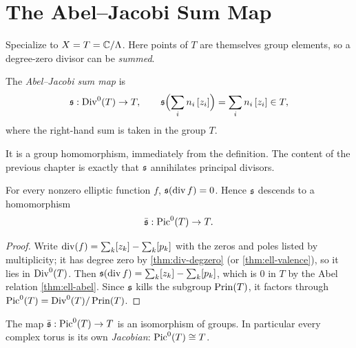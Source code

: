 \section{The Abel--Jacobi Sum Map}
\label{sec:div-abel-jacobi}

Specialize to \(X = T = \mathbb{C}/\Lambda\). Here points of \(T\) are themselves group
elements, so a degree-zero divisor can be \emph{summed}.

\begin{definition}
\label{def:div-sigma}
The \emph{Abel--Jacobi sum map} is
\[
  \mathfrak{s} : \operatorname{Div}^0(T) \to T,
  \qquad
  \mathfrak{s}\Bigl( \sum_i n_i\,[z_i] \Bigr) = \sum_i n_i\,[z_i] \in T,
\]
where the right-hand sum is taken in the group \(T\).
\end{definition}

It is a group homomorphism, immediately from the definition. The content of the
previous chapter is exactly that \(\mathfrak{s}\) annihilates principal divisors.

\begin{proposition}
\label{prop:div-sigma-kills-prin}
For every nonzero elliptic function \(f\), \(\mathfrak{s}(\operatorname{div} f) = 0\). Hence
\(\mathfrak{s}\) descends to a homomorphism
\[
  \bar{\mathfrak{s}} : \operatorname{Pic}^0(T) \to T .
\]
\end{proposition}

\begin{proof}
Write \(\operatorname{div}(f) = \sum_k [z_k] - \sum_k [p_k]\) with the zeros and poles
listed by multiplicity; it has degree zero by \cref{thm:div-degzero} (or
\cref{thm:ell-valence}), so it lies in \(\operatorname{Div}^0(T)\). Then
\(\mathfrak{s}(\operatorname{div} f) = \sum_k [z_k] - \sum_k [p_k]\), which is \(0\) in \(T\) by
the Abel relation \cref{thm:ell-abel}. Since \(\mathfrak{s}\) kills the subgroup
\(\operatorname{Prin}(T)\), it factors through \(\operatorname{Pic}^0(T) = \operatorname{Div}^0(T)/\operatorname{Prin}(T)\).
\end{proof}

\begin{theorem}
\label{thm:div-pic-iso}
The map \(\bar{\mathfrak{s}} : \operatorname{Pic}^0(T) \to T\) is an isomorphism of groups. In
particular every complex torus is its own \emph{Jacobian}:
\(\operatorname{Pic}^0(T) \cong T\).
\end{theorem}

